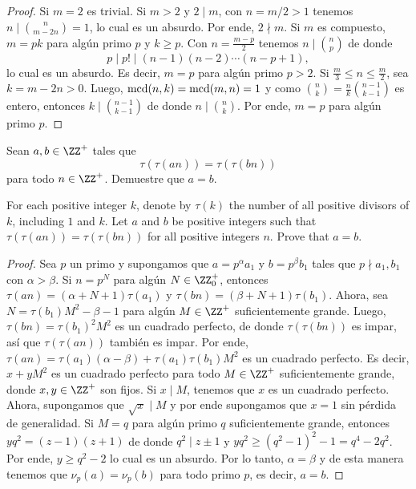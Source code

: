 \begin{proof}
	Si $m=2$ es trivial. Si $m>2$ y $2\mid m$, con $n=m/2>1$ tenemos $n\mid\binom{n}{m-2n}=1$, lo cual es un absurdo. Por ende, $2\nmid m$. Si $m$ es compuesto, $m=pk$ para algún primo $p$ y $k\ge p$. Con $n=\frac{m-p}{2}$ tenemos $n\mid\binom np$ de donde
	\[p\mid p!\mid(n-1)(n-2)\cdots(n-p+1),\]
	lo cual es un absurdo. Es decir, $m=p$ para algún primo $p>2$. Si $\frac m3\le n\le\frac m2$, sea $k=m-2n>0$. Luego, $\operatorname{mcd}(n,k)=\operatorname{mcd}(m,n)=1$ y como $\binom nk=\frac nk\binom{n-1}{k-1}$ es entero, entonces $k\mid\binom{n-1}{k-1}$ de donde $n\mid\binom nk$. Por ende, $m=p$ para algún primo $p$.
\end{proof}

\begin{probMG}
	Sean $a,b\in\ZZ^+$ tales que
	\[\tau(\tau(an))=\tau(\tau(bn))\]
	para todo $n\in\ZZ^+$. Demuestre que $a=b$.
	\begin{hint}
		For each positive integer $k$, denote by $\tau(k)$ the number of all positive divisors of $k$, including $1$ and $k$. Let $a$ and $b$ be positive integers such that $\tau(\tau(an))=\tau(\tau(bn))$ for all positive integers $n$. Prove that $a=b$.
	\end{hint}
\end{probMG}

\begin{proof}
	Sea $p$ un primo y supongamos que $a=p^\alpha a_1$ y $b=p^\beta b_1$ tales que $p\nmid a_1,b_1$ con $\alpha>\beta$. Si $n=p^N$ para algún $N\in\ZZ^+_0$, entonces $\tau(an)=(\alpha+N+1)\tau(a_1)$ y $\tau(bn)=(\beta+N+1)\tau(b_1)$. Ahora, sea $N=\tau(b_1)M^2-\beta-1$ para algún $M\in\ZZ^+$ suficientemente grande. Luego, $\tau(bn)=\tau(b_1)^2M^2$ es un cuadrado perfecto, de donde $\tau(\tau(bn))$ es impar, así que $\tau(\tau(an))$ también es impar. Por ende, $\tau(an)=\tau(a_1)(\alpha-\beta)+\tau(a_1)\tau(b_1)M^2$ es un cuadrado perfecto. Es decir, $x+yM^2$ es un cuadrado perfecto para todo $M\in\ZZ^+$ suficientemente grande, donde $x,y\in\ZZ^+$ son fijos. Si $x\mid M$, tenemos que $x$ es un cuadrado perfecto. Ahora, supongamos que $\sqrt{x}\mid M$ y por ende supongamos que $x=1$ sin pérdida de generalidad. Si $M=q$ para algún primo $q$ suficientemente grande, entonces $yq^2=(z-1)(z+1)$ de donde $q^2\mid z\pm 1$ y $yq^2\ge(q^2-1)^2-1=q^4-2q^2$. Por ende, $y\ge q^2-2$ lo cual es un absurdo. Por lo tanto, $\alpha=\beta$ y de esta manera tenemos que $\nu_p(a)=\nu_p(b)$ para todo primo $p$, es decir, $a=b$.
\end{proof}

